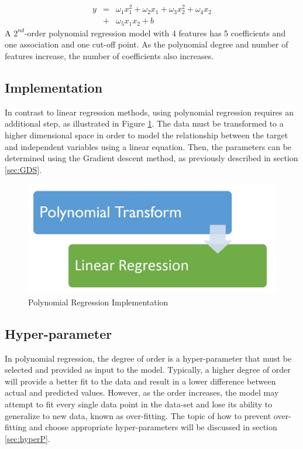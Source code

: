 {\begin{eqnarray}\label{eq:MpolyEq}
\nonumber  y &=& \omega_1 x_1^2 + \omega_2 x_1 + \omega_3 x_2^2 + \omega_4 x_2 \\
             &+& \omega_5 x_1 x_2 + b
\end{eqnarray} A $2^{nd}$-order polynomial regression model with 4 features has 5 coefficients and one association and one cut-off point. As the polynomial degree and number of features increase, the number of coefficients also increases.

\newpage
\subsection{Implementation}
In contrast to linear regression methods, using polynomial regression requires an additional step, as illustrated in Figure \ref{fig:polyImple}. The data must be transformed to a higher dimensional space in order to model the relationship between the target and independent variables using a linear equation. Then, the parameters can be determined using the Gradient descent method, as previously described in section \ref{sec:GDS}.

\begin{figure}[!ht]
  \centering
  \includegraphics[width=6 cm]{poly_transform.jpg}
  \caption{Polynomial Regression Implementation}
  \label{fig:polyImple}
\end{figure}

\newpage
\subsection{Hyper-parameter}
In polynomial regression, the degree of order is a hyper-parameter that must be selected and provided as input to the model. Typically, a higher degree of order will provide a better fit to the data and result in a lower difference between actual and predicted values. However, as the order increases, the model may attempt to fit every single data point in the data-set and lose its ability to generalize to new data, known as over-fitting. The topic of how to prevent over-fitting and choose appropriate hyper-parameters will be discussed in section \ref{sec:hyperP}.

}
